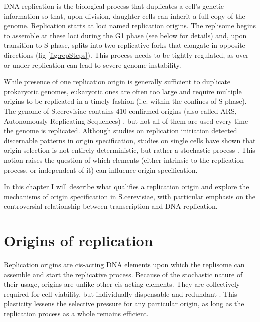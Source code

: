DNA replication is the biological process that duplicates a cell’s genetic information so that, upon division, daughter cells can inherit a full copy of the genome. 
Replication starts at loci named replication origins. The replisome begins to assemble at these loci during the G1 phase (see below for details) and, upon transition to S-phase, splits into two replicative forks that elongate in opposite directions (fig \ref{fig:repSteps}). 
This process needs to be tightly regulated, as over- or under-replication can lead to severe genome instability. 


While presence of one replication origin is generally sufficient to duplicate prokaryotic genomes, eukaryotic ones are often too large and require multiple origins to be replicated in a timely fashion (i.e. within the confines of S-phase). 
The genome of S.cerevisiae contains 410 confirmed origins (also called ARS, Autonomously Replicating Sequences) \cite{siow:2012:oridb}, but not all of them are used every time the genome is replicated.
Although studies on replication initiation detected discernable patterns in origin specification, studies on single cells have shown that origin selection is not entirely deterministic, but rather a stochastic process \cite{patel:2006:dna, Czajkowsky:2008:dna}. 
This notion raises the question of which elements (either intrinsic to the replication process, or independent of it) can influence origin specification.

In this chapter I will describe what qualifies a replication origin and explore the mechanisms of origin specification in S.cerevisiae, with particular emphasis on the controversial relationship between transcription and DNA replication.

\section{Origins of replication}

Replication origins are cis-acting DNA elements upon which the replisome can assemble and start the replicative process. Because of the stochastic nature of their usage, origins are unlike other cis-acting elements. 
They are collectively required for cell viability, but individually dispensable and redundant \cite{bogenschutz:2014:initiation, dershowitz:2007:linear}. 
This plasticity lessens the selective pressure for any particular origin, as long as the replication process as a whole remains efficient. 


